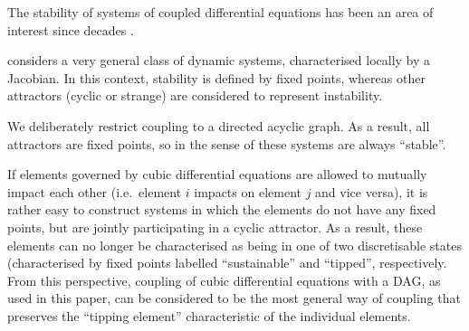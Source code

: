 \documentclass[letterpaper]{article}
\begin{document}
The stability of systems of coupled differential equations has been an
area of interest since decades
\citep{May1972_stablelargecomplexsystem,Landi2018_ecologicalnetworks}.

\citet{May1972_stablelargecomplexsystem} considers a very general
class of dynamic systems, characterised locally by a Jacobian. In this
context, stability is defined by fixed points, whereas other
attractors (cyclic or strange) are considered to represent
instability.

We deliberately restrict coupling to a directed acyclic graph. As a
result, all attractors are fixed points, so in the sense of
\citet{May1972_stablelargecomplexsystem} these systems are always
``stable''.

If elements governed by cubic differential equations are allowed to
mutually impact each other (i.e.\ element $i$ impacts on element $j$
and vice versa), it is rather easy to construct systems in which the
elements do not have any fixed points, but are jointly participating
in a cyclic attractor. As a result, these elements can no longer be
characterised as being in one of two discretisable states
(characterised by fixed points labelled ``sustainable'' and
``tipped'', respectively. From this perspective, coupling of cubic
differential equations with a DAG, as used in this paper, can be
considered to be the most general way of coupling that preserves the
``tipping element'' characteristic of the individual elements.






\end{document}
